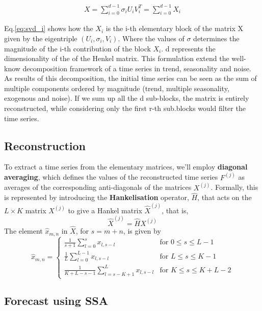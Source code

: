 \begin{align}\label{eq:svd_i}
	X = \sum_{i=0}^{d-1} \sigma_i U_i V_{i}^T = \sum_{i=0}^{d-1}X_i
\end{align}

Eq.\ref{eq:svd_i} shows how the $X_i$ is the i-th elementary block of the matrix X given by the eigentriple $(U_i, \sigma_i, V_i)$.
Where the values of $\sigma$ determines the magnitude of the i-th contribution of the block $X_i$.
d represents the dimensionality of the of the Henkel matrix. This formulation extend the well-know decomposition 
framework of a time series in trend, seasonality and noise. As results of this decomposition, the initial time series
can be seen as the sum of multiple components ordered by magnitude (trend, multiple seasonality, exogenous and noise).
If we sum up all the d sub-blocks, the matrix is entirely reconstructed, while considering only the first r-th sub.blocks would filter the time series. 

\subsection{Reconstruction}
To extract a time series from the elementary matrices, we'll employ \textbf{diagonal averaging}, which defines the values of the reconstructed time series \( F^{(j)} \) as averages of the corresponding anti-diagonals of the matrices \( X^{(j)} \). Formally, this is represented by introducing the \textbf{Hankelisation} operator, \( \hat{H} \), that acts on the \( L \times K \) matrix \( X^{(j)} \) to give a Hankel matrix \( \hat{X}^{(j)} \), that is,
\[
\hat{X}^{(j)} = \hat{H}X^{(j)}
\]
The element \( \hat{x}_{m,n} \) in \( \hat{X} \), for \( s = m + n \), is given by
\[
\hat{x}_{m,n} = 
\begin{cases} 
\frac{1}{s+1} \sum_{l=0}^{s} x_{l,s-l} & \text{for } 0 \leq s \leq L - 1 \\
\frac{1}{L} \sum_{l=0}^{L-1} x_{l,s-l} & \text{for } L \leq s \leq K - 1 \\
\frac{1}{K+L-s-1} \sum_{l=s-K+1}^{L} x_{l,s-l} & \text{for } K \leq s \leq K + L - 2
\end{cases}
\]

\subsection{Forecast using SSA }
